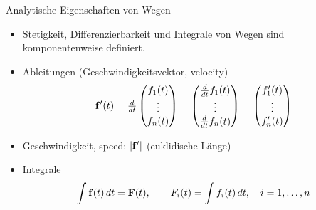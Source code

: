 \begin{frame}{Analytische Eigenschaften von Wegen}
    \begin{itemize}
        \item Stetigkeit, Differenzierbarkeit und Integrale von Wegen sind komponentenweise definiert.
        \item Ableitungen (Geschwindigkeitsvektor, velocity)
        \begin{gather*}
            \mathbf{f}'(t) = \tfrac{d}{dt}
            \begin{pmatrix}
              f_1(t)\\
              \vdots\\
              f_n(t)
            \end{pmatrix}
            =
            \begin{pmatrix}
              \tfrac{d}{dt} f_1(t)\\
              \vdots\\
              \tfrac{d}{dt} f_n(t)
            \end{pmatrix}
            = \begin{pmatrix}
                f_1'(t)\\\vdots\\f_n'(t)
            \end{pmatrix}
          \end{gather*}
        \item Geschwindigkeit, speed: $\left|\mathbf{f}'\right|$ (euklidische Länge)
        \item Integrale
          \begin{gather*}
            \int \mathbf{f}(t)\,dt = \mathbf{F}(t),
            \qquad F_i(t) = \int f_i(t)\,dt,\quad i=1,\dots,n
          \end{gather*}
    \end{itemize}
\end{frame}

